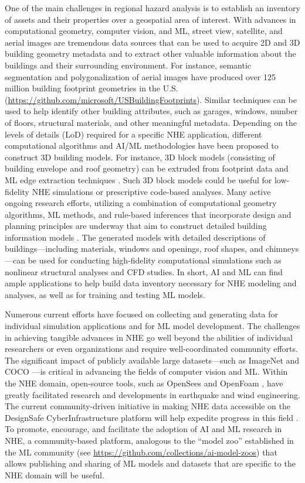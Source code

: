 One of the main challenges in regional hazard analysis is to establish an inventory of assets and their properties over a geospatial area of interest. With advances in computational geometry, computer vision, and ML, street view, satellite, and aerial images are tremendous data sources that can be used to acquire 2D and 3D building geometry metadata and to extract other valuable information about the buildings and their surrounding environment. For instance, semantic segmentation and polygonalization of aerial images have produced over 125 million building footprint geometries in the U.S. (\url{https://github.com/microsoft/USBuildingFootprints}). Similar techniques can be used to help identify other building attributes, such as garages, windows, number of floors, structural materials, and other meaningful metadata. Depending on the levels of details (LoD) required for a specific NHE application, different computational algorithms and AI/ML methodologies have been proposed to construct 3D building models. For instance, 3D block models (consisting of building envelope and roof geometry) can be extruded from footprint data and ML edge extraction techniques \citep{maninis2017convolutional,yu2017casenet}. Such 3D block models could be useful for low-fidelity NHE simulations or prescriptive code-based analyses. Many active ongoing research efforts, utilizing a combination of computational geometry algorithms, ML methods, and rule-based inferences that incorporate design and planning principles are underway that aim to construct detailed building information models \citep{martinovic20153d,chen2018automatic}. The generated models with detailed descriptions of buildings---including materials, windows and openings, roof shapes, and chimneys---can be used for conducting high-fidelity computational simulations such as nonlinear structural analyses and CFD studies. In short, AI and ML can find ample applications to help build data inventory necessary for NHE modeling and analyses, as well as for training and testing ML models. 

Numerous current efforts have focused on collecting and generating data for individual simulation applications and for ML model development. The challenges in achieving tangible advances in NHE go well beyond the abilities of individual researchers or even organizations and require well-coordinated community efforts. The significant impact of publicly available large datasets---such as ImageNet \citep{deng2009imagenet} and COCO \citep{lin2014microsoft}---is critical in advancing the fields of computer vision and ML. Within the NHE domain, open-source tools, such as OpenSees \citep{mckenna2011opensees} and OpenFoam \citep{chen2014openfoam}, have greatly facilitated research and developments in earthquake and wind engineering. The current community-driven initiative in making NHE data accessible on the DesignSafe CyberInfrastructure platform will help expedite progress in this field \citep{rathje2017designsafe}. To promote, encourage, and facilitate the adoption of AI and ML research in NHE, a community-based platform, analogous to the ``model zoo'' established in the ML community (see \url{https://github.com/collections/ai-model-zoos}) that allows publishing and sharing of ML models and datasets that are specific to the NHE domain will be useful. 


